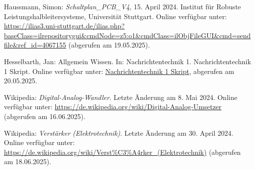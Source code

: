 \begin{thebibliography}{1}

Haussmann, Simon: \emph{Schaltplan\_PCB\_V4}, 15. April 2024. Institut für Robuste Leistungshalbleitersysteme, Universität Stuttgart. Online verfügbar unter: \url{https://ilias3.uni-stuttgart.de/ilias.php?baseClass=ilrepositorygui&cmdNode=z5:o1&cmdClass=ilObjFileGUI&cmd=sendfile&ref_id=4067155} (abgerufen am 19.05.2025).

Hesselbarth, Jan: Allgemein Wissen. In: Nachrichtentechnik 1. Nachrichtentechnik 1 Skript. Online verfügbar unter: \url{Nachrichtentechnik 1 Skript}, abgerufen am 20.05.2025.

Wikipedia: \emph{Digital-Analog-Wandler}. Letzte Änderung am 8. Mai 2024.  
Online verfügbar unter: \url{https://de.wikipedia.org/wiki/Digital-Analog-Umsetzer} (abgerufen am 16.06.2025).

Wikipedia: \emph{Verstärker (Elektrotechnik)}. Letzte Änderung am 30. April 2024.  
Online verfügbar unter: \url{https://de.wikipedia.org/wiki/Verst%C3%A4rker_(Elektrotechnik)} (abgerufen am 18.06.2025).

\end{thebibliography}

\clearpage
